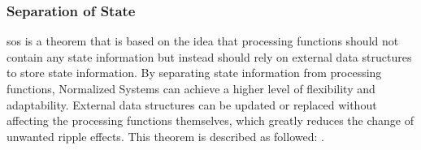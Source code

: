 \subsubsection{Separation of State}

\gls{sos} is a theorem that is based on the idea that processing functions should not
contain any state information but instead should rely on external data structures to store
state information. By separating state information from processing functions, Normalized
Systems can achieve a higher level of flexibility and adaptability. External data
structures can be updated or replaced without affecting the processing functions
themselves, which greatly reduces the change of unwanted ripple effects. This theorem is
described as followed: \parencite[258]{mannaert_normalized_2016}.

